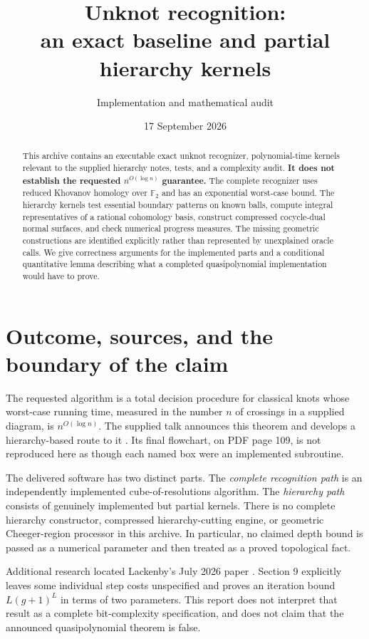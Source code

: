 \documentclass[11pt]{article}
\title{Unknot recognition:\\an exact baseline and partial hierarchy kernels}
\author{Implementation and mathematical audit}
\date{17 September 2026}
\theoremstyle{definition}
\newcommand{\F}{\mathbb F_2}
\begin{document}
\maketitle

\begin{abstract}
This archive contains an executable exact unknot recognizer, polynomial-time
kernels relevant to the supplied hierarchy notes, tests, and a complexity audit.
\textbf{It does not establish the requested $n^{O(\log n)}$ guarantee.}
The complete recognizer uses reduced Khovanov homology over $\F$ and has an
exponential worst-case bound. The hierarchy kernels test essential boundary
patterns on known balls, compute integral representatives of a rational
cohomology basis, construct compressed cocycle-dual normal surfaces, and check
numerical progress measures. The missing geometric constructions are identified
explicitly rather than represented by unexplained oracle calls. We give
correctness arguments for the implemented parts and a conditional quantitative
lemma describing what a completed quasipolynomial implementation would have to
prove.
\end{abstract}

\setcounter{tocdepth}{1}
\tableofcontents
\newpage

\section{Outcome, sources, and the boundary of the claim}

The requested algorithm is a total decision procedure for classical knots whose
worst-case running time, measured in the number $n$ of crossings in a supplied
diagram, is $n^{O(\log n)}$. The supplied talk announces this theorem and develops
a hierarchy-based route to it \cite{slides}. Its final flowchart, on PDF page
109, is not reproduced here as though each named box were an implemented
subroutine.

The delivered software has two distinct parts. The \emph{complete recognition
path} is an independently implemented cube-of-resolutions algorithm. The
\emph{hierarchy path} consists of genuinely implemented but partial kernels.
There is no complete hierarchy constructor, compressed hierarchy-cutting
engine, or geometric Cheeger-region processor in this archive. In particular,
no claimed depth bound is passed as a numerical parameter and then treated as a
proved topological fact.

Additional research located Lackenby's July 2026 paper \cite{hierarchies}.
Section 9 explicitly leaves some individual step costs unspecified and proves
an iteration bound $L(g+1)^L$ in terms of two parameters. This report does not
interpret that result as a complete bit-complexity specification, and does not
claim that the announced quasipolynomial theorem is false.
\end{document}
